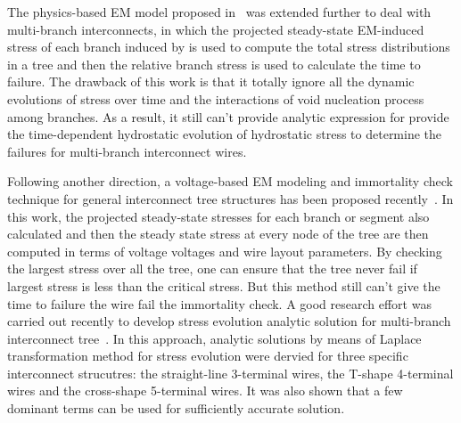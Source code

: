 The physics-based EM model proposed
in~\cite{HuangYu:DAC'14,HuangTan:TCAD'16} was extended further to deal
with multi-branch interconnects, in which the projected steady-state
EM-induced stress of each branch induced by is used to compute the
total stress distributions in a tree and then the relative branch
stress is used to calculate the time to failure. The drawback of this
work is that it totally ignore all the dynamic evolutions of stress
over time and the interactions of void nucleation process among
branches. As a result, it still can't provide analytic expression for
provide the time-dependent hydrostatic evolution of hydrostatic stress
to determine the failures for multi-branch interconnect wires.

Following another direction, a voltage-based EM modeling and
immortality check technique for general interconnect tree structures
has been proposed recently~\cite{SunDemircan:ICCAD'16}. In this work,
the projected steady-state stresses for each branch or segment also
calculated and then the steady state stress at every node of the tree
are then computed in terms of voltage voltages and wire layout
parameters. By checking the largest stress over all the tree, one can
ensure that the tree never fail if largest stress is less than the
critical stress. But this method still can't give the time to failure
the wire fail the immortality check. A good research effort was
carried out recently to develop stress evolution analytic solution for
multi-branch interconnect
tree~\cite{ChenHuang:DAC'15,ChenTan:TCAD'16}.  In this approach,
analytic solutions by means of Laplace transformation method for
stress evolution were dervied for three specific interconnect
strucutres: the straight-line 3-terminal wires, the T-shape 4-terminal
wires and the cross-shape 5-terminal wires. It was also shown that a
few dominant terms can be used for sufficiently accurate solution.



